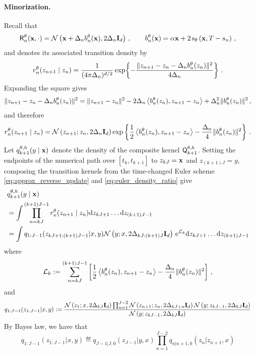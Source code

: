 \documentclass[11pt]{article}
\theoremstyle{plain}
\theoremstyle{definition}
\theoremstyle{remark}
\begin{document}
\paragraph{Minorization.}
Recall that
$$
\mathsf{R}_n^\theta(\x,\cdot) = \gaussiand{ \x+\Delta_n b_n^\theta(\x) }{ 2\Delta_n\Id_\xdim } \eqsp, 
\qquad b_n^\theta(\x) = \isvp\x+2\scorenet[T-s_n][\x][\theta] \eqsp,
$$
and denotes its associated transition density by
$$
r_n^\theta(z_{n+1}\mid z_n) = \frac{1}{(4 \pi \Delta_n)^{d/2}} \exp\!\left\{ -\frac{ \|z_{n+1}-z_n-\Delta_n b_n^\theta(z_n)\|^2 }{ 4 \Delta_n } \right\} \,.
$$
Expanding the square gives
\begin{multline*}
\|z_{n+1}-z_n-\Delta_n b_n^\theta(z_n)\|^2 
= \|z_{n+1}-z_n\|^2  - 2 \Delta_n \left<b_n^\theta(z_n), z_{n+1}-z_n\right> + \Delta_n^2\|b_n^\theta(z_n)\|^2 \,,
\end{multline*}
and therefore
\begin{equation}
\label{eq:euler_density_ratio}
r_n^\theta(z_{n+1}\mid z_n)
= \gaussiand{z_{n+1} ; z_n}{2 \Delta_n \Id_\xdim} \exp \left\{ \frac12 \dotprod{b_n^\theta(z_n)}{z_{n+1}-z_n} - \frac{\Delta_n}{4} \|b_n^\theta(z_n)\|^2 \right\} \eqsp.
\end{equation}
%
Let $q_{k+1}^{\theta,h}(y\mid\mathbf{x})$ denote the density of the composite kernel $\mk{k+1}[\theta,h]$. Setting the endpoints of the numerical path over $[t_k,t_{k+1}]$ to $z_{kJ}=\mathbf{x}$ and $z_{(k+1)J}=y$, composing the transition kernels from the time-changed Euler scheme 
\eqref{eq:approx_reverse_update} and \eqref{eq:euler_density_ratio} give
\begin{align*}
& q_{k+1}^{\theta,h}(y\mid\x) \\
&= \int \prod_{n=kJ}^{(k+1)J-1} r_n^\theta(z_{n+1}\mid z_n) \rmd z_{ kJ+1} \ldots \rmd z_{(k+1)J-1} \\
&= \int q_{1:J-1}(z_{kJ+1:(k+1)J - 1} | x, y) \gaussiand{x}{2\Delta_{kJ:(k+1)J}\Id_\xdim}[y]\, \rme^{\mathcal L_k} \rmd z_{ kJ+1} \ldots \rmd z_{(k+1)J-1}
\end{align*}
where
$$
\mathcal L_k := \sum_{n=kJ}^{(k+1)J-1} \left[ \frac12 \left<b_n^\theta(z_n), z_{n+1}-z_n\right> - \frac{\Delta_n}{4} \|b_n^\theta(z_n)\|^2 \right] \,,
$$
and
$$
q_{1:J-1}(z_{1:J - 1} | x, y) \eqdef \frac{\gaussiand{z_{1};x}{2\Delta_{kJ}\Id_\xdim}\prod_{n=1}^{J-2} \gaussiand{z_{n+1};z_n}{2\Delta_{kJ+n}\Id_\xdim} \gaussiand{z_{kJ-1}}{2\Delta_{kJ}\Id_\xdim}[y]}
{\gaussiand{z_{kJ-1}}{2\Delta_{kJ}\Id_\xdim}[y]}
$$
By Bayes law, we have that
\begin{equation}
    \label{eq:pont_rpz}
    q_{1:J-1}(z_{1:J - 1} | x, y) \eqdef q_{J-1|J,0}(z_{J-1}|y, x)\prod_{n=1}^{J-2}q_{n|n+1,0}(z_n |z_{n+1}, x)
\end{equation}
\end{document}
